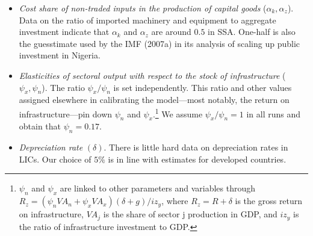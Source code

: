 \documentclass[11pt]{article}
\begin{document}
\begin{itemize}
\item \textit{Cost share of non-traded inputs in the production of capital
goods} ($\alpha _{k},\alpha _{z}$). Data on the ratio of imported machinery
and equipment to aggregate investment indicate that $\alpha _{k}$ and $%
\alpha _{z}$ are around $0.5$ in SSA. One-half is also the guesstimate used
by the IMF (2007a) in its analysis of scaling up public investment in
Nigeria.

\item \textit{Elasticities of sectoral output with respect to the stock of
infrastructure} ($\psi _{x},\psi _{n}$). The ratio $\psi _{x}/\psi _{n}$ is
set independently. This ratio and other values assigned elsewhere in
calibrating the model---most notably, the return on infrastructure---pin
down $\psi _{n}$ and $\psi _{x}$.\footnote{$\psi _{n}$ and $\psi _{x}$ are
linked to other parameters and variables through $R_{z}=(\psi
_{n}VA_{n}+\psi _{x}VA_{x})(\delta +g)/iz_{y}$, where $R_{z}=R+\delta $ is
the gross return on infrastructure, $VA_{j}$ is the share of sector j
production in GDP, and $iz_{y}$ is the ratio of infrastructure investment to
GDP.} We assume $\psi _{x}/\psi _{n}=1$ in all runs and obtain that $\psi
_{n}=0.17.$

\item \textit{Depreciation rate }$(\delta )$. There is little hard data on
depreciation rates in LICs. Our choice of $5\%$ is in line with estimates
for developed countries.
\end{itemize}
\end{document}
